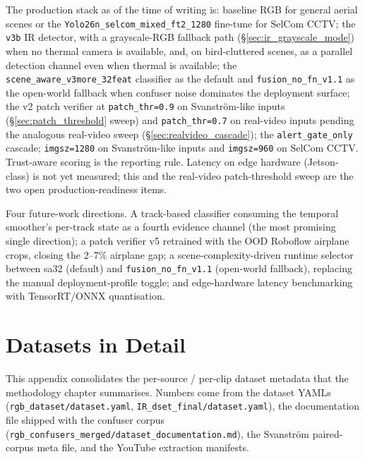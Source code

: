 \documentclass[12pt,a4paper,oneside,openright]{book}
\begin{document}
The production stack as of the time of writing is: baseline RGB for general aerial scenes or the \texttt{Yolo26n\_selcom\_mixed\_ft2\_1280} fine-tune for SelCom CCTV; the \texttt{v3b} IR detector, with a grayscale-RGB fallback path (\S\ref{sec:ir_grayscale_mode}) when no thermal camera is available, and, on bird-cluttered scenes, as a parallel detection channel even when thermal is available; the \texttt{scene\_aware\_v3more\_32feat} classifier as the default and \texttt{fusion\_no\_fn\_v1.1} as the open-world fallback when confuser noise dominates the deployment surface; the v2 patch verifier at \texttt{patch\_thr=0.9} on Svanstr\"om-like inputs (\S\ref{sec:patch_threshold} sweep) and \texttt{patch\_thr=0.7} on real-video inputs pending the analogous real-video sweep (\S\ref{sec:realvideo_cascade}); the \texttt{alert\_gate\_only} cascade; \texttt{imgsz=1280} on Svanstr\"om-like inputs and \texttt{imgsz=960} on SelCom CCTV. Trust-aware scoring is the reporting rule. Latency on edge hardware (Jetson-class) is not yet measured; this and the real-video patch-threshold sweep are the two open production-readiness items.

Four future-work directions. A track-based classifier consuming the temporal smoother's per-track state as a fourth evidence channel (the most promising single direction); a patch verifier v5 retrained with the OOD Roboflow airplane crops, closing the 2--7\% airplane gap; a scene-complexity-driven runtime selector between sa32 (default) and \texttt{fusion\_no\_fn\_v1.1} (open-world fallback), replacing the manual deployment-profile toggle; and edge-hardware latency benchmarking with TensorRT/ONNX quantisation.

\appendix

\chapter{Datasets in Detail}
\label{app:datasets}

This appendix consolidates the per-source / per-clip dataset metadata that the methodology chapter summarises. Numbers come from the dataset YAMLs (\texttt{rgb\_dataset/dataset.yaml}, \texttt{IR\_dset\_final/dataset.yaml}), the documentation file shipped with the confuser corpus (\texttt{rgb\_confusers\_merged/dataset\_documentation.md}), the Svanstr\"om paired-corpus meta file, and the YouTube extraction manifests.
\end{document}
